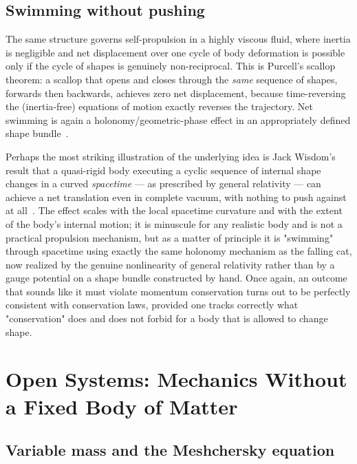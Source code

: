 \subsection{Swimming without pushing}

The same structure governs self-propulsion in a highly viscous
fluid, where inertia is negligible and net displacement over one
cycle of body deformation is possible only if the cycle of shapes is
genuinely non-reciprocal. This is Purcell's scallop theorem: a
scallop that opens and closes through the \emph{same} sequence of
shapes, forwards then backwards, achieves zero net displacement,
because time-reversing the (inertia-free) equations of motion
exactly reverses the trajectory. Net swimming is again a
holonomy/geometric-phase effect in an appropriately defined shape
bundle~\cite{ShapereWilczekSwim1989}.

Perhaps the most striking illustration of the underlying idea is Jack
Wisdom's result that a quasi-rigid body executing a cyclic sequence
of internal shape changes in a curved \emph{spacetime} --- as
prescribed by general relativity --- can achieve a net translation
even in complete vacuum, with nothing to push against at
all~\cite{Wisdom2003}. The effect scales with the local spacetime
curvature and with the extent of the body's internal motion; it is
minuscule for any realistic body and is not a practical propulsion
mechanism, but as a matter of principle it is "swimming" through
spacetime using exactly the same holonomy mechanism as the falling
cat, now realized by the genuine nonlinearity of general relativity
rather than by a gauge potential on a shape bundle constructed by
hand. Once again, an outcome that sounds like it must violate
momentum conservation turns out to be perfectly consistent with
conservation laws, provided one tracks correctly what "conservation"
does and does not forbid for a body that is allowed to change shape.

\section{Open Systems: Mechanics Without a Fixed Body of Matter}
\label{sec:open}

\subsection{Variable mass and the Meshchersky equation}

